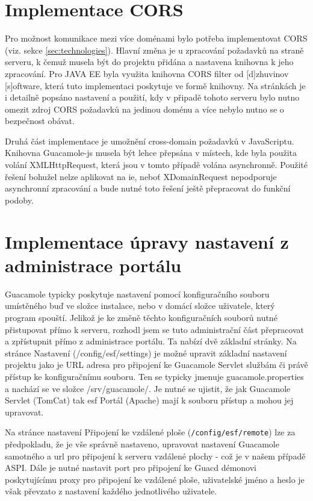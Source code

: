 \section{Implementace CORS}
Pro možnost komunikace mezi více doménami bylo potřeba implementovat CORS (viz. sekce \ref{sec:technologies}). Hlavní změna je u zpracování požadavků na straně serveru, k čemuž musela být do projektu přidána a nastavena knihovna k jeho zpracování. Pro JAVA EE byla využita knihovna CORS filter od [d]zhuvinov  [s]oftware\cite{website:cors-filter}, která tuto implementaci poskytuje ve formě knihovny. Na stránkách je i detailně popsáno nastavení a použití, kdy v připadě tohoto serveru bylo nutno omezit zdroj CORS požadavků na jedinou doménu a více nebylo nutno se o bezpečnost obávat.

Druhá část implementace je umožnění cross-domain požadavků v JavaScriptu. Knihovna Guacamole-js musela být lehce přepsána v místech, kde byla použita volání XMLHttpRequest, která jsou v tomto případě volána asynchronně. Použité řešení bohužel nelze aplikovat na \gls{ie}, neboť XDomainRequest nepodporuje asynchronní zpracování a bude nutné toto řešení ještě přepracovat do funkční podoby.

\section{Implementace úpravy nastavení z administrace portálu}
Guacamole typicky poskytuje nastavení pomocí konfiguračního souboru umístěného buď ve složce instalace, nebo v domácí složce uživatele, který program spouští. Jelikož je ke změně těchto konfiguračních souborů nutné přistupovat přímo k serveru, rozhodl jsem se tuto administrační část přepracovat a zpřístupnit přímo z administrace portálu. Ta nabízí dvě základní stránky. Na stránce Nastavení (/config/esf/settings) je možné upravit základní nastavení projektu jako je URL adresa pro připojení ke Guacamole Servlet službám či právě přístup ke konfiguračnímu souboru. Ten se typicky jmenuje guacamole.properties a nachází se ve složce /srv/guacamole/. Je nutné se ujistit, že jak Guacamole Servlet (TomCat) tak \gls{esf} Portál (Apache) mají k souboru přístup a mohou jej upravovat.

Na stránce nastavení Připojení ke vzdálené ploše (\texttt{/config/esf/remote}) lze za předpokladu, že je vše správně nastaveno, upravovat nastavení Guacamole samotného a url pro připojení k serveru vzdálené plochy - což je v našem případě ASPI. Dále je nutné nastavit port pro připojení ke Guacd démonovi poskytujícímu proxy pro připojení ke vzdálené ploše, uživatelské jméno a heslo je však převzato z nastavení každého jednotlivého uživatele.

